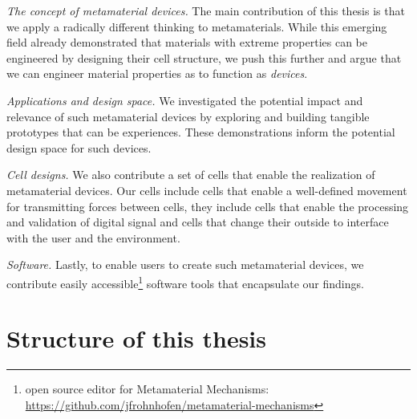 \textit{The concept of metamaterial devices.} \enspace The main contribution of this thesis is that we apply a radically different thinking to metamaterials. While this emerging field already demonstrated that materials with extreme properties can be engineered by designing their cell structure, we push this further and argue that we can engineer material properties as to function as \textit{devices}. 

\textit{Applications and design space.} \enspace We investigated the potential impact and relevance of such metamaterial devices by exploring and building tangible prototypes that can be experiences. These demonstrations inform the potential design space for such devices.

\textit{Cell designs.} \enspace We also contribute a set of cells that enable the realization of metamaterial devices. Our cells include cells that enable a well-defined movement for transmitting forces between cells, they include cells that enable the processing and validation of digital signal and cells that change their outside to interface with the user and the environment.

\textit{Software.} \enspace Lastly, to enable users to create such metamaterial devices, we contribute easily accessible\footnote{open source editor for Metamaterial Mechanisms: \url{https://github.com/jfrohnhofen/metamaterial-mechanisms}} software tools that encapsulate our findings.



\section{Structure of this thesis}

